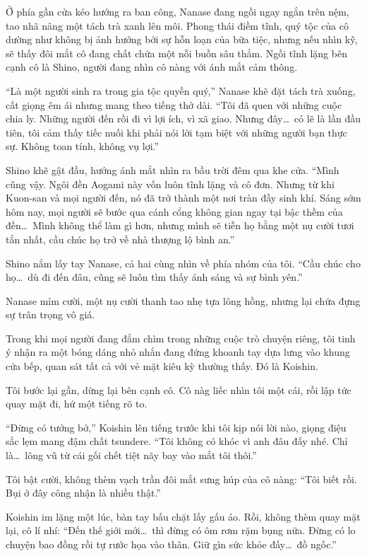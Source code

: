 \documentclass[../main.tex]{subfiles}
\begin{document}
\ct

Ở phía gần cửa kéo hướng ra ban công, Nanase đang ngồi ngay ngắn trên nệm, tao nhã nâng một tách trà xanh lên môi. Phong thái điềm tĩnh, quý tộc của cô dường như không bị ảnh hưởng bởi sự hỗn loạn của bữa tiệc, nhưng nếu nhìn kỹ, sẽ thấy đôi mắt cô đang chất chứa một nỗi buồn sâu thẳm. Ngồi tĩnh lặng bên cạnh cô là Shino, người đang nhìn cô nàng với ánh mắt cảm thông.

``Là một người sinh ra trong gia tộc quyền quý,'' Nanase khẽ đặt tách trà xuống, cất giọng êm ái nhưng mang theo tiếng thở dài. ``Tôi đã quen với những cuộc chia ly. Những người đến rồi đi vì lợi ích, vì xã giao. Nhưng đây\dots\ có lẽ là lần đầu tiên, tôi cảm thấy tiếc nuối khi phải nói lời tạm biệt với những người bạn thực sự. Không toan tính, không vụ lợi.''

Shino khẽ gật đầu, hướng ánh mắt nhìn ra bầu trời đêm qua khe cửa. ``Mình cũng vậy. Ngôi đền Aogami này vốn luôn tĩnh lặng và cô đơn. Nhưng từ khi Kuon-san và mọi người đến, nó đã trở thành một nơi tràn đầy sinh khí. Sáng sớm hôm nay, mọi người sẽ bước qua cánh cổng không gian ngay tại bậc thềm của đền\dots\ Mình không thể làm gì hơn, nhưng mình sẽ tiễn họ bằng một nụ cười tươi tắn nhất, cầu chúc họ trở về nhà thượng lộ bình an.''

Shino nắm lấy tay Nanase, cả hai cùng nhìn về phía nhóm của tôi. ``Cầu chúc cho họ\dots\ dù đi đến đâu, cũng sẽ luôn tìm thấy ánh sáng và sự bình yên.''

Nanase mỉm cười, một nụ cười thanh tao nhẹ tựa lông hồng, nhưng lại chứa đựng sự trân trọng vô giá.

\ct

Trong khi mọi người đang đắm chìm trong những cuộc trò chuyện riêng, tôi tinh ý nhận ra một bóng dáng nhỏ nhắn đang đứng khoanh tay dựa lưng vào khung cửa bếp, quan sát tất cả với vẻ mặt kiêu kỳ thường thấy. Đó là Koishin.

Tôi bước lại gần, dừng lại bên cạnh cô. Cô nàg liếc nhìn tôi một cái, rồi lập tức quay mặt đi, hứ một tiếng rõ to.

``Đừng có tưởng bở,'' Koishin lên tiếng trước khi tôi kịp nói lời nào, giọng điệu sắc lẹm mang đậm chất tsundere. ``Tôi không có khóc vì anh đâu đấy nhé. Chỉ là\dots\ lông vũ từ cái gối chết tiệt nãy bay vào mắt tôi thôi.''

Tôi bật cười, không thèm vạch trần đôi mắt sưng húp của cô nàng: ``Tôi biết rồi. Bụi ở đây công nhận là nhiều thật.''

Koishin im lặng một lúc, bàn tay bấu chặt lấy gấu áo. Rồi, không thèm quay mặt lại, cô lí nhí: ``Đến thế giới mới\dots\ thì đừng có ôm rơm rặm bụng nữa. Đừng có lo chuyện bao đồng rồi tự rước họa vào thân. Giữ gìn sức khỏe đấy\dots\ đồ ngốc.''
\end{document}
